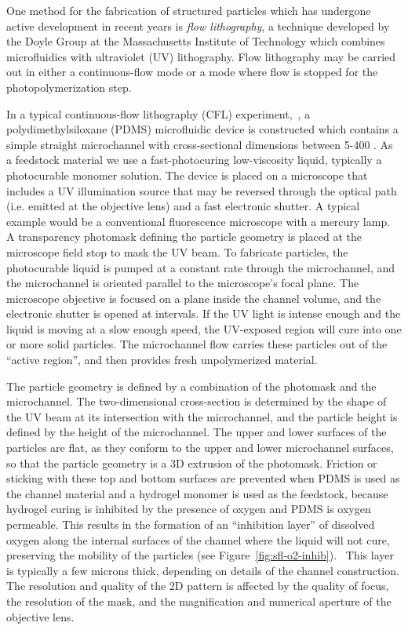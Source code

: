 One method for the fabrication of structured particles which has undergone active development in recent years is 
\textit{flow lithography}, a technique developed by the Doyle Group at 
the Massachusetts Institute of Technology which combines microfluidics with 
ultraviolet (UV) lithography.  Flow lithography may be carried out in either a continuous-flow mode or a 
mode where flow is stopped for the photopolymerization step.


In a typical continuous-flow lithography (CFL) experiment,~\cite{dendukuri-cfl},
a polydimethylsiloxane (PDMS) microfluidic device is constructed
which contains a simple straight microchannel with cross-sectional dimensions between 5-400 \microns. As a feedstock
material we use a fast-photocuring low-viscosity liquid, typically a photocurable monomer solution. The device is 
placed on a microscope that includes a UV illumination source that may be reversed through the optical path (i.e.
emitted at the objective lens) and a fast electronic shutter. A typical example would be a conventional 
fluorescence microscope with a mercury lamp.  A
transparency photomask defining the particle geometry is placed at the microscope
field stop to mask the UV beam.
To fabricate particles, the photocurable liquid is pumped 
at a constant rate through the microchannel, and the microchannel is oriented
parallel to the microscope's focal plane. The microscope objective is focused on a plane inside the channel
volume, and the
electronic shutter is opened at intervals. If the UV light is intense enough and the liquid is moving at a slow enough speed,
the UV-exposed region will cure into one or more solid particles.  
The microchannel flow carries these particles out of the ``active 
region'', and then provides fresh unpolymerized material.



The particle geometry is defined by a combination of the photomask and the microchannel.  The two-dimensional cross-section
is determined by the shape of the UV beam at its intersection with the microchannel, and the particle height is defined by
the height of the microchannel. The upper and lower surfaces of the particles
are flat, as they conform to the upper and lower microchannel surfaces, so that the particle geometry
is a 3D extrusion of the photomask.
Friction or sticking with these top and bottom
surfaces are prevented when PDMS is used as the channel material and a hydrogel monomer is 
used as the feedstock,
because hydrogel
curing is inhibited by the presence of oxygen and PDMS is oxygen permeable. This results in the formation of an 
``inhibition layer'' of dissolved oxygen
along the internal surfaces of the channel where the liquid will not cure, preserving the mobility 
of the particles (see Figure~\ref{fig:sfl-o2-inhib}).~\cite{dendukuri-oxygen}
This layer is typically a few microns thick, depending on 
details of the channel construction.
The resolution and quality of the 2D pattern 
is affected by the quality of focus, the resolution of the mask,
and the magnification and numerical aperture of the objective lens.  

